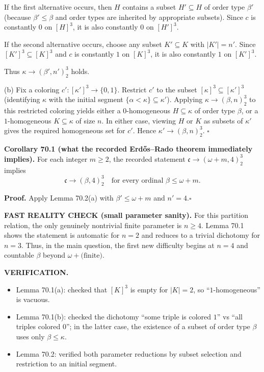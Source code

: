 If the first alternative occurs, then $H$ contains a subset $H'\subseteq H$ of order type $\beta'$ (because $\beta'\le\beta$ and order types are inherited by appropriate subsets). Since $c$ is constantly $0$ on $[H]^3$, it is also constantly $0$ on $[H']^3$.

If the second alternative occurs, choose any subset $K'\subseteq K$ with $|K'|=n'$. Since $[K']^3\subseteq[K]^3$ and $c$ is constantly $1$ on $[K]^3$, it is also constantly $1$ on $[K']^3$.

Thus $\kappa\to(\beta',n')_2^3$ holds.

(b) Fix a coloring $c':[\kappa']^3\to\{0,1\}$. Restrict $c'$ to the subset $[\kappa]^3\subseteq[\kappa']^3$ (identifying $\kappa$ with the initial segment $\{\alpha<\kappa\}\subseteq\kappa'$). Applying $\kappa\to(\beta,n)_2^3$ to this restricted coloring yields either a $0$-homogeneous $H\subseteq\kappa$ of order type $\beta$, or a $1$-homogeneous $K\subseteq\kappa$ of size $n$. In either case, viewing $H$ or $K$ as subsets of $\kappa'$ gives the required homogeneous set for $c'$. Hence $\kappa'\to(\beta,n)_2^3$.
\hfill$\square$

\medskip
\noindent\textbf{Corollary 70.1 (what the recorded Erd\H{o}s--Rado theorem immediately implies).}
For each integer $m\ge 2$, the recorded statement $\mathfrak c\to(\omega+m,4)_2^3$ implies
\[\mathfrak c\to(\beta,4)_2^3\quad\text{for every ordinal }\beta\le \omega+m.
\]

\noindent\textbf{Proof.}
Apply Lemma 70.2(a) with $\beta'\le\omega+m$ and $n'=4$.\hfill$\square$

\medskip
\noindent\textbf{FAST REALITY CHECK (small parameter sanity).}
For this partition relation, the only genuinely nontrivial finite parameter is $n\ge 4$. Lemma 70.1 shows the statement is automatic for $n=2$ and reduces to a trivial dichotomy for $n=3$. Thus, in the main question, the first new difficulty begins at $n=4$ and countable $\beta$ beyond $\omega+\text{(finite)}$.

\medskip
\noindent\textbf{VERIFICATION.}
\begin{itemize}
\item Lemma 70.1(a): checked that $[K]^3$ is empty for $|K|=2$, so ``$1$-homogeneous'' is vacuous.
\item Lemma 70.1(b): checked the dichotomy ``some triple is colored $1$'' vs ``all triples colored $0$''; in the latter case, the existence of a subset of order type $\beta$ uses only $\beta\le\kappa$.
\item Lemma 70.2: verified both parameter reductions by subset selection and restriction to an initial segment.
\end{itemize}

